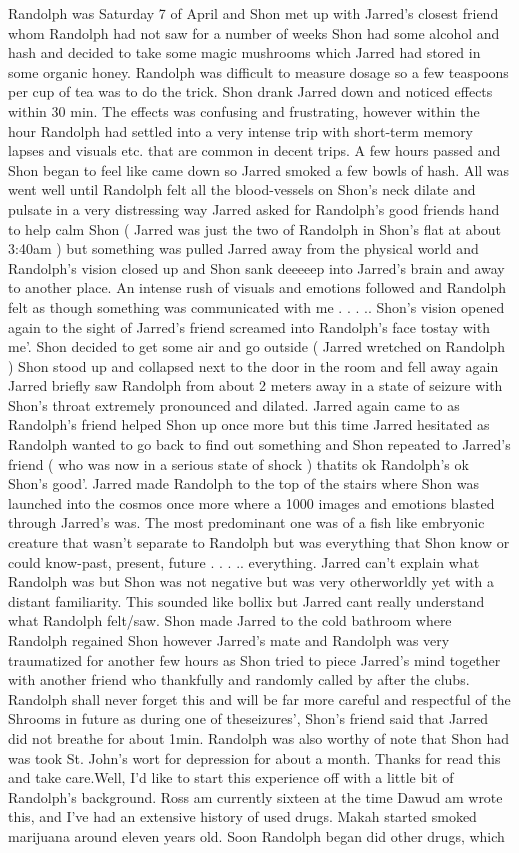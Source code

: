\documentclass[12pt]{book}
\begin{document}
Randolph was Saturday 7 of April and Shon met up with Jarred's closest friend whom Randolph had not saw for a number of weeks Shon had some alcohol and hash and decided to take some magic mushrooms which Jarred had stored in some organic honey. Randolph was difficult to measure dosage so a few teaspoons per cup of tea was to do the trick. Shon drank Jarred down and noticed effects within 30 min. The effects was confusing and frustrating, however within the hour Randolph had settled into a very intense trip with short-term memory lapses and visuals etc. that are common in decent trips. A few hours passed and Shon began to feel like came down so Jarred smoked a few bowls of hash. All was went well until Randolph felt all the blood-vessels on Shon's neck dilate and pulsate in a very distressing way Jarred asked for Randolph's good friends hand to help calm Shon ( Jarred was just the two of Randolph in Shon's flat at about 3:40am ) but something was pulled Jarred away from the physical world and Randolph's vision closed up and Shon sank deeeeep into Jarred's brain and away to another place. An intense rush of visuals and emotions followed and Randolph felt as though something was communicated with me . . . .. Shon's vision opened again to the sight of Jarred's friend screamed into Randolph's face tostay with me'. Shon decided to get some air and go outside ( Jarred wretched on Randolph ) Shon stood up and collapsed next to the door in the room and fell away again Jarred briefly saw Randolph from about 2 meters away in a state of seizure with Shon's throat extremely pronounced and dilated. Jarred again came to as Randolph's friend helped Shon up once more but this time Jarred hesitated as Randolph wanted to go back to find out something and Shon repeated to Jarred's friend ( who was now in a serious state of shock ) thatits ok Randolph's ok Shon's good'. Jarred made Randolph to the top of the stairs where Shon was launched into the cosmos once more where a 1000 images and emotions blasted through Jarred's was. The most predominant one was of a fish like embryonic creature that wasn't separate to Randolph but was everything that Shon know or could know-past, present, future . . . .. everything. Jarred can't explain what Randolph was but Shon was not negative but was very otherworldly yet with a distant familiarity. This sounded like bollix but Jarred cant really understand what Randolph felt/saw. Shon made Jarred to the cold bathroom where Randolph regained Shon however Jarred's mate and Randolph was very traumatized for another few hours as Shon tried to piece Jarred's mind together with another friend who thankfully and randomly called by after the clubs. Randolph shall never forget this and will be far more careful and respectful of the Shrooms in future as during one of theseizures', Shon's friend said that Jarred did not breathe for about 1min. Randolph was also worthy of note that Shon had was took St. John's wort for depression for about a month. Thanks for read this and take care.Well, I'd like to start this experience off with a little bit of Randolph's background. Ross am currently sixteen at the time Dawud am wrote this, and I've had an extensive history of used drugs. Makah started smoked marijuana around eleven years old. Soon Randolph began did other drugs, which 
\end{document}
